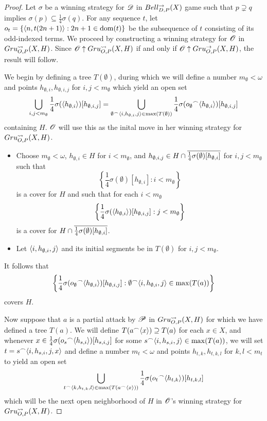 \begin{proof}
  Let $\sigma$ be a winning strategy for $\mathscr{D}$ in $Bell_{D,P}^{\to}(X)$
  game such that $p\supsetneq q$ implies
  $\sigma(p)\subseteq \frac{1}{4}\sigma(q)$.
  For any sequence $t$, let $o_t=\{\langle n,t(2n+1)\rangle:2n+1\in\textrm{dom}(t)\}$
  be the subsequence of $t$ consisting of its odd-indexed terms.
  We proceed by constructing a winning strategy for $\mathscr{O}$ in
  $Gru_{O,P}^{\leadsto}(X,H)$. Since $\mathscr{O}\uparrow Gru_{O,P}^{\leadsto}(X,H)$
  if and only if $\mathscr{O}\uparrow Gru_{O,P}^{\to}(X,H)$, the result will follow.


  We begin by defining a tree $T(\emptyset)$, during which we will
  define a number $m_\emptyset<\omega$ and points
  $h_{\emptyset,i},h_{\emptyset,i,j}$ for $i,j<m_\emptyset$
  which yield an open set
    \[
      \bigcup_{i,j<m_\emptyset}
        \frac{1}{4}\sigma(\langle h_{\emptyset,i}\rangle)[h_{\emptyset,i,j}]
      =
      \bigcup_{\emptyset{^\frown}\langle i,h_{\emptyset,i},j\rangle\in\max(T(\emptyset))}
        \frac{1}{4}\sigma(o_\emptyset{^\frown}\langle h_{\emptyset,i}\rangle)[h_{\emptyset,i,j}]
    \]
  containing $H$. $\mathscr{O}$ will use this as the inital move in her winning
  strategy for $Gru_{O,P}^{\leadsto}(X,H)$.

  \begin{itemize}
    \item
    Choose $m_\emptyset<\omega$, $h_{\emptyset,i}\in H$ for $i<m_\emptyset$, and
    $h_{\emptyset,i,j}\in H\cap\overline{\frac{1}{4}\sigma(\emptyset)[h_{\emptyset,i}]}$
    for $i,j<m_\emptyset$ such that
      \[
        \left\{\frac{1}{4}\sigma(\emptyset)[h_{\emptyset,i}]:i<m_\emptyset\right\}
      \]
    is a cover for $H$ and such that for each $i<m_\emptyset$
      \[
        \left\{\frac{1}{4}\sigma(\langle h_{\emptyset,i}\rangle)[h_{\emptyset,i,j}]:j<m_\emptyset\right\}
      \]
    is a cover for $H\cap\overline{\frac{1}{4}\sigma(\emptyset)[h_{\emptyset,i}]}$.
    \item
    Let $\langle i,h_{\emptyset,i},j\rangle$ and its initial segments be in
    $T(\emptyset)$ for $i,j<m_\emptyset$.
  \end{itemize}

  It follows that
    \[
      \left\{
        \frac{1}{4}\sigma(o_\emptyset{^\frown}\langle h_{\emptyset,i}\rangle)[h_{\emptyset,i,j}]
      :
        \emptyset{^\frown}\langle i,h_{\emptyset,i},j\rangle\in\max(T(a))
      \right\}
    \]
  covers $H$.


  Now suppose that $a$ is a partial attack by $\mathscr{P}$ in $Gru_{O,P}^{\leadsto}(X,H)$
  for which we have defined a tree $T(a)$.
  We will define $T(a{^\frown}\langle x\rangle)\supseteq T(a)$ for each $x\in X$, and
  whenever $x\in \frac{1}{4}\sigma(o_s{^\frown}\langle h_{s,i}\rangle)[h_{s,i,j}]$ for
  some $s{^\frown}\langle i,h_{s,i},j\rangle\in\max(T(a))$, we will set
  $t=s{^\frown}\langle i,h_{s,i},j,x\rangle$ and define a number $m_t<\omega$ and points
  $h_{t,k},h_{t,k,l}$ for $k,l<m_t$ to yield an open set
    \[
      \bigcup_{t{^\frown}\langle k,h_{t,k},l\rangle\in\max(T(a{^\frown}\langle x\rangle))}
        \frac{1}{4}\sigma(o_t{^\frown}\langle h_{t,k}\rangle)[h_{t,k,l}]
    \]
  which will be the next open neighborhood of $H$ in $\mathscr{O}$'s winning strategy
  for $Gru_{O,P}^{\leadsto}(X,H)$.


\end{proof}
